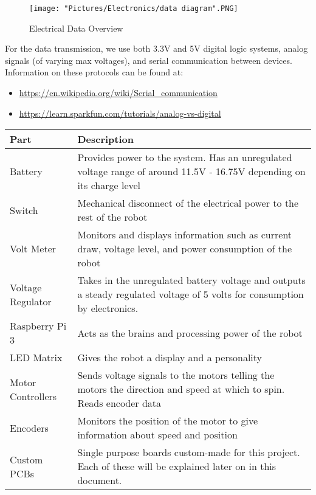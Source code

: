 \documentclass[12pt]{article}
\begin{document}
\begin{figure}[H]
  	\centering
   	\texttt{[image: "Pictures/Electronics/data diagram".PNG]}
  	\caption{Electrical Data Overview}
	\label{data}
\end{figure}

\noindent For the data transmission, we use both 3.3V and 5V digital logic systems, analog signals (of varying max voltages), and serial communication between devices. Information on these protocols can be found at:

\begin{itemize}
	\item \href{https://en.wikipedia.org/wiki/Serial_communication}{https://en.wikipedia.org/wiki/Serial\_communication}
	\item \href{https://learn.sparkfun.com/tutorials/analog-vs-digital}{https://learn.sparkfun.com/tutorials/analog-vs-digital}
\end{itemize}


\begin{tabular}[2]{|p{4cm}|p{11cm}|}
	\hline
	\textbf{Part} & \textbf{Description} \\ \hline
	Battery & Provides power to the system. Has an unregulated voltage range of around 11.5V - 16.75V depending on its charge level \\ \hline
	Switch & Mechanical disconnect of the electrical power to the rest of the robot \\ \hline
	Volt Meter & Monitors and displays information such as current draw, voltage level, and power consumption of the robot \\ \hline
	Voltage Regulator & Takes in the unregulated battery voltage and outputs a steady regulated voltage of 5 volts for consumption by electronics. \\ \hline
	Raspberry Pi 3 & Acts as the brains and processing power of the robot \\ \hline
	LED Matrix & Gives the robot a display and a personality\\ \hline
	Motor Controllers & Sends voltage signals to the motors telling the motors the direction and speed at which to spin. Reads encoder data \\ \hline
	Encoders & Monitors the position of the motor to give information about speed and position \\ \hline
	Custom PCBs & Single purpose boards custom-made for this project. Each of these will be explained later on in this document. \\ \hline
\end{tabular}
\end{document}
